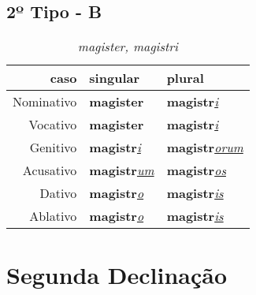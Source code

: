 \documentclass{article}
\newcommand{\radicaldesinencia}[2]{\textbf{#1}\textit{\underline{#2}}}
\begin{document}
\subsection*{2º Tipo - B}
\begin{table}[H]
\centering
\caption*{\textit{magister, magistri}}
\vspace{0.2cm}
\begin{tabular}{r|l|l}
\hline
caso			&	singular					& plural 								\\
\hline                                    		
\hline
Nominativo	&	\radicaldesinencia{magister}{}	& \radicaldesinencia{magistr}{i}		\\
Vocativo		&	\radicaldesinencia{magister}{}	& \radicaldesinencia{magistr}{i}		\\
Genitivo		&	\radicaldesinencia{magistr}{i}	& \radicaldesinencia{magistr}{orum}		\\
Acusativo	&	\radicaldesinencia{magistr}{um}	& \radicaldesinencia{magistr}{os}	\\
Dativo		&	\radicaldesinencia{magistr}{o}	& \radicaldesinencia{magistr}{is}		\\
Ablativo		&	\radicaldesinencia{magistr}{o}	& \radicaldesinencia{magistr}{is}		\\


 \hline
\end{tabular}
\end{table}
\clearpage





\section*{Segunda Declinação}
\end{document}
